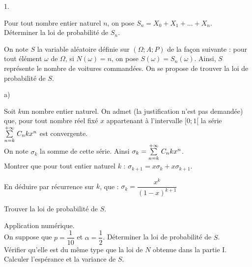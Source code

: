 \documentclass[11pt]{article}%
\begin{document}
\begin{noliste}{1.}
 \setlength{\itemsep}{4mm}
\item Pour tout nombre entier naturel $n$, on pose $S_{n} = X_{0} +
X_{1} +... + X_{n}$.\\
Déterminer la loi de probabilité de $S_{n}$.

\item On note $S$ la variable aléatoire définie sur $(\Omega ;A;P)$ de
la façon suivante : pour tout élément $\omega $ de $\Omega $, si
$N(\omega ) = n$,
on pose $S(\omega ) = S_{n}(\omega )$. Ainsi, $S$ représente le nombre
de
voitures commandées. On se propose de trouver la loi de probabilité de
$S.$

\begin{noliste}{a)}
 \setlength{\itemsep}{2mm}
\item Soit $k$un nombre entier naturel. On admet (la justification
n'est pas
demandée) que, pour tout nombre réel fixé $x$ appartenant à
l'intervalle $[0;1[$ la série ${\textstyle\sum\limits_{n = k}^{+ \infty }}\hspace{.1cm}C_{n}{k}x^{n}$ est
convergente.\\
On note $\sigma_{k}$ la somme de cette série. Ainsi $\sigma
_{k} = {\textstyle\sum\limits_{n = k}^{+ \infty }}\hspace{.1cm}C_{n}{k}x^{n}$.\\
Montrer que pour tout entier naturel $k$ : $\sigma_{k + 1} = x\sigma
_{k} + x\sigma_{k + 1}$.

\item En déduire par récurrence sur $k$, que : $\sigma_{k} =
\dfrac{{x^{k}}}{{\left( {1-x}\right) ^{k + 1}}}$

\item Trouver la loi de probabilité de $S$.

\item Application numérique.\\
On suppose que $p = \dfrac{1}{10}$ et $\alpha = \dfrac{1}{2}$.
Déterminer la
loi de probabilité de $S$.\\
Vérifier qu'elle est du même type que la loi de $N$ obtenue dans la
partie I.\\
Calculer l'espérance et la variance de $S$.
\end{noliste}
\end{noliste}

\label{fin}
\end{document}
